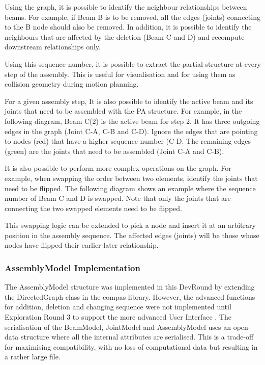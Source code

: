 Using the graph, it is possible to identify the neighbour relationships between beams. For example, if Beam B is to be removed, all the edges (joints) connecting to the B node should also be removed. In addition, it is possible to identify the neighbours that are affected by the deletion (Beam C and D) and recompute downstream relationships only. 

Using this sequence number, it is possible to extract the partial structure at every step of the assembly. This is useful for visualisation and for using them as collision geometry during motion planning.

For a given assembly step, It is also possible to identify the active beam and its joints that need to be assembled with the PA structure. For example, in the following diagram, Beam C(2) is the active beam for step 2. It has three outgoing edges in the graph (Joint C-A, C-B and C-D). Ignore the edges that are pointing to nodes (red) that have a higher sequence number (C-D. The remaining edges (green) are the joints that need to be assembled (Joint C-A and C-B). 

It is also possible to perform more complex operations on the graph. For example, when swapping the order between two elements, identify the joints that need to be flipped. The following diagram shows an example where the sequence number of Beam C and D is swapped. Note that only the joints that are connecting the two swapped elements need to be flipped.

This swapping logic can be extended to pick a node and insert it at an arbitrary position in the assembly sequence.  The affected edges (joints) will be those whose nodes have flipped their earlier-later relationship. 

\subsubsection{AssemblyModel Implementation}
\label{subsubsection:exploration-2-assemblymodel-implementation}

The AssemblyModel structure was implemented in this DevRound by extending the DirectedGraph class in the compas library. However, the advanced functions for addition, deletion and changing sequence were not implemented until Exploration Round 3 to support the more advanced User Interface .
The serialisation of the BeamModel, JointModel and AssemblyModel uses an open-data structure where all the internal attributes are serialised. This is a trade-off for maximising compatibility, with no loss of computational data but resulting in a rather large file. 

